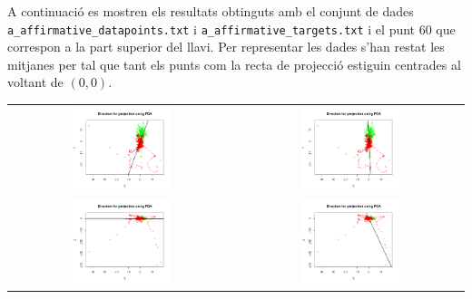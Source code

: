 \documentclass[a4paper]{article}
\begin{document}
A continuació es mostren els resultats obtinguts amb el conjunt de dades \verb|a_affirmative_datapoints.txt| i \verb|a_affirmative_targets.txt| i el punt 60 que correspon a la part superior del llavi. Per representar les dades s'han restat les mitjanes per tal que tant els punts com la recta de projecció estiguin centrades al voltant de $(0,0)$.

\begin{longtable}{cc}
	\includegraphics[width=0.45\textwidth]{images/FDA_XY} &
	\includegraphics[width=0.45\textwidth]{images/PCA_XY} \\
	\includegraphics[width=0.45\textwidth]{images/FDA_XZ} &
	\includegraphics[width=0.45\textwidth]{images/PCA_XZ} \\

\end{longtable}
\end{document}
